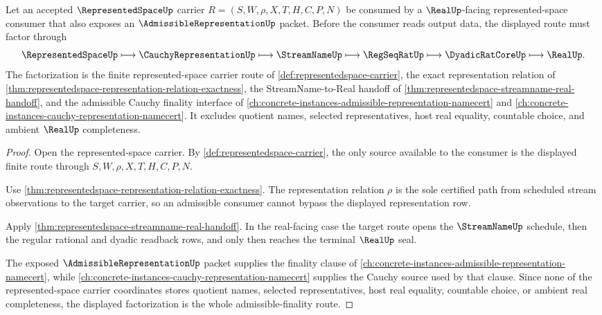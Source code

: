 \begin{theorem}
\label{thm:representedspace-admissible-finality}
Let an accepted $\RepresentedSpaceUp$ carrier $R=(S,W,\rho,X,T,H,C,P,N)$ be consumed by a $\RealUp$-facing represented-space consumer that also exposes an $\AdmissibleRepresentationUp$ packet. Before the consumer reads output data, the displayed route must factor through
$$
\RepresentedSpaceUp \longmapsto \CauchyRepresentationUp \longmapsto \StreamNameUp \longmapsto \RegSeqRatUp \longmapsto \DyadicRatCoreUp \longmapsto \RealUp .
$$
The factorization is the finite represented-space carrier route of \autoref{def:representedspace-carrier}, the exact representation relation of \autoref{thm:representedspace-representation-relation-exactness}, the StreamName-to-Real handoff of \autoref{thm:representedspace-streamname-real-handoff}, and the admissible Cauchy finality interface of \autoref{ch:concrete-instances-admissible-representation-namecert} and \autoref{ch:concrete-instances-cauchy-representation-namecert}. It excludes quotient names, selected representatives, host real equality, countable choice, and ambient $\RealUp$ completeness.
\end{theorem}
\begin{proof}
Open the represented-space carrier. By \autoref{def:representedspace-carrier}, the only source available to the consumer is the displayed finite route through $S,W,\rho,X,T,H,C,P,N$.

Use \autoref{thm:representedspace-representation-relation-exactness}. The representation relation $\rho$ is the sole certified path from scheduled stream observations to the target carrier, so an admissible consumer cannot bypass the displayed representation row.

Apply \autoref{thm:representedspace-streamname-real-handoff}. In the real-facing case the target route opens the $\StreamNameUp$ schedule, then the regular rational and dyadic readback rows, and only then reaches the terminal $\RealUp$ seal.

The exposed $\AdmissibleRepresentationUp$ packet supplies the finality clause of \autoref{ch:concrete-instances-admissible-representation-namecert}, while \autoref{ch:concrete-instances-cauchy-representation-namecert} supplies the Cauchy source used by that clause. Since none of the represented-space carrier coordinates stores quotient names, selected representatives, host real equality, countable choice, or ambient real completeness, the displayed factorization is the whole admissible-finality route.
\end{proof}

